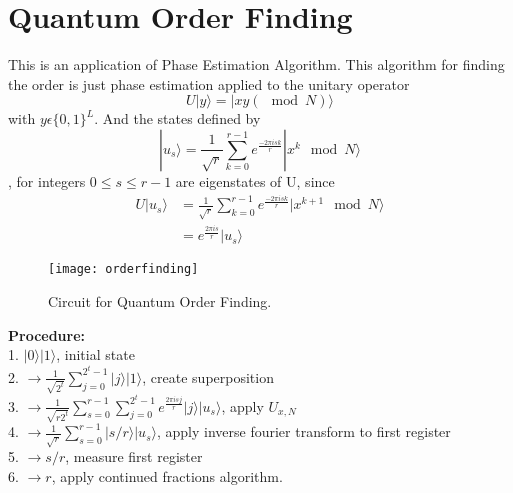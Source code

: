 \documentclass[12pt]{report}
\begin{document}
\section{Quantum Order Finding}
This is an application of Phase Estimation Algorithm. This algorithm for finding the order is just phase estimation applied to the unitary operator 
\begin{equation}
U|y\rangle = |xy(\mod N)\rangle
\end{equation}
with $y\epsilon\{0,1\}^L$. And the states defined by \\
\begin{equation}
|u_s\rangle = \frac{1}{\sqrt{r}}\sum_{k=0}^{r-1} e^{\frac{-2\pi isk}{r}} |x^k \mod N\rangle
\end{equation}, for integers $0\le s \le r-1$ are eigenstates of U, since
\begin{equation}
\begin{split}
U|u_s\rangle & = \frac{1}{\sqrt{r}}\sum_{k=0}^{r-1} e^{\frac{-2\pi isk}{r}} |x^{k+1} \mod N\rangle \\
& = e^{\frac{2\pi is}{r}}|u_s\rangle
\end{split}
\end{equation}
\begin{figure}[h]
\centering
\texttt{[image: orderfinding]}
\caption{Circuit for Quantum Order Finding.}
\label{fig:orderfindingt}
\end{figure}
\linebreak
\textbf{Procedure:}\\
1. $|0\rangle |1\rangle$, initial state\\
2. $\to\frac{1}{\sqrt{2^t}}\sum_{j=0}^{2^t - 1} |j\rangle|1\rangle$, create superposition\\
3. $\to\frac{1}{\sqrt{r2^t}}\sum_{s=0}^{r - 1} \sum_{j=0}^{2^t - 1}  e^{\frac{2\pi isj}{r}} |j\rangle|u_s\rangle$,  apply $U_{x,N}$\\
4. $\to\frac{1}{\sqrt{r}}\sum_{s=0}^{r - 1}|s/r\rangle|u_s\rangle$, apply inverse fourier transform to first register\\
5. $\to s/r$, measure first register\\
6. $\to r$, apply continued fractions algorithm.
\end{document}

